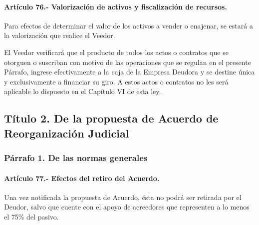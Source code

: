 \documentclass[
]{book}
\begin{document}
\hypertarget{artuxedculo-76.--valorizaciuxf3n-de-activos-y-fiscalizaciuxf3n-de-recursos.}{%
\paragraph*{Artículo 76.- Valorización de activos y fiscalización de recursos.}\label{artuxedculo-76.--valorizaciuxf3n-de-activos-y-fiscalizaciuxf3n-de-recursos.}}

Para efectos de determinar el valor de los activos a vender o enajenar, se estará a la valorización que realice el Veedor.

El Veedor verificará que el producto de todos los actos o contratos que se otorguen o suscriban con motivo de las operaciones que se regulan en el presente Párrafo, ingrese efectivamente a la caja de la Empresa Deudora y se destine única y exclusivamente a financiar su giro. A estos actos o contratos no les será aplicable lo dispuesto en el Capítulo VI de esta ley.

\hypertarget{tuxedtulo-2.-de-la-propuesta-de-acuerdo-de-reorganizaciuxf3n-judicial}{%
\subsection*{Título 2. De la propuesta de Acuerdo de Reorganización Judicial}\label{tuxedtulo-2.-de-la-propuesta-de-acuerdo-de-reorganizaciuxf3n-judicial}}

\hypertarget{puxe1rrafo-1.-de-las-normas-generales}{%
\subsubsection*{Párrafo 1. De las normas generales}\label{puxe1rrafo-1.-de-las-normas-generales}}

\hypertarget{artuxedculo-77.--efectos-del-retiro-del-acuerdo.}{%
\paragraph*{Artículo 77.- Efectos del retiro del Acuerdo.}\label{artuxedculo-77.--efectos-del-retiro-del-acuerdo.}}

Una vez notificada la propuesta de Acuerdo, ésta no podrá ser retirada por el Deudor, salvo que cuente con el apoyo de acreedores que representen a lo menos el 75\% del pasivo.
\end{document}

